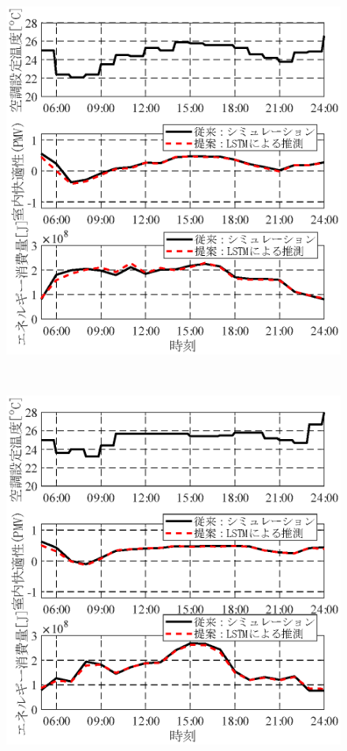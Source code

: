 \begin{figure}[htbp]
\begin{center}
\begin{minipage}{0.45\textwidth}
\begin{center}
        \includegraphics[width=1\textwidth,keepaspectratio=true]{fig/surrogate_result_schedule_b.eps}\\\vspace{-5mm}{\small スケジュール B (中間の解)}
      \end{center}
    \end{minipage}
    \\
    \begin{minipage}{0.45\textwidth}
      \begin{center}
        \includegraphics[width=1\textwidth,keepaspectratio=true]{fig/surrogate_result_schedule_c.eps}\\\vspace{-5mm}

\end{center}
\end{minipage}
\end{center}
\end{figure}
